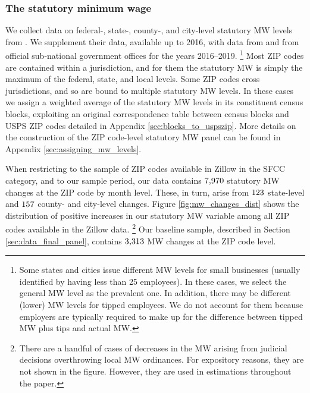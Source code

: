 \subsubsection{The statutory minimum wage}

We collect data on federal-, state-, county-, and city-level statutory MW levels 
from \textcite{VaghulZipperer2016}.
We supplement their data, available up to 2016, with data from 
\textcite{BerkeleyLaborCenter} and from official sub-national government offices 
for the years 2016--2019.%
\footnote{Some states and cities issue different MW levels for small businesses
(usually identified by having less than 25 employees).
In these cases, we select the general MW level as the prevalent one.
In addition, there may be different (lower) MW levels for tipped employees.
We do not account for them because employers are typically required to make up 
for the difference between tipped MW plus tips and actual MW.}
%
%
Most ZIP codes are contained within a jurisdiction, and for them the statutory 
MW is simply the maximum of the federal, state, and local levels.
Some ZIP codes cross jurisdictions, and so are bound to multiple statutory MW 
levels.
In these cases we assign a weighted average of the statutory MW levels in its
constituent census blocks, exploiting an original correspondence table between 
census blocks and USPS ZIP codes detailed in 
Appendix \ref{sec:blocks_to_uspszip}.
More details on the construction of the ZIP code-level statutory MW panel 
can be found in Appendix \ref{sec:assigning_mw_levels}.

When restricting 
to the sample of ZIP codes available in Zillow in the SFCC category, and 
to our sample period, our data contains
$\textnormal{7,970}$ statutory MW changes at the ZIP code by month level.
These, in turn, arise from 
$\textnormal{123}$ state-level and 
$\textnormal{157}$ county- and city-level changes.
Figure \ref{fig:mw_changes_dist} shows the distribution of positive increases in
our statutory MW variable among all ZIP codes available in the Zillow data.%
\footnote{There are a handful of cases of decreases in the MW arising from 
judicial decisions overthrowing local MW ordinances.
For expository reasons, they are not shown in the figure.
However, they are used in estimations throughout the paper.}
Our baseline sample, described in Section \ref{sec:data_final_panel}, 
contains $\textnormal{3,313}$ MW changes at the ZIP code level.

